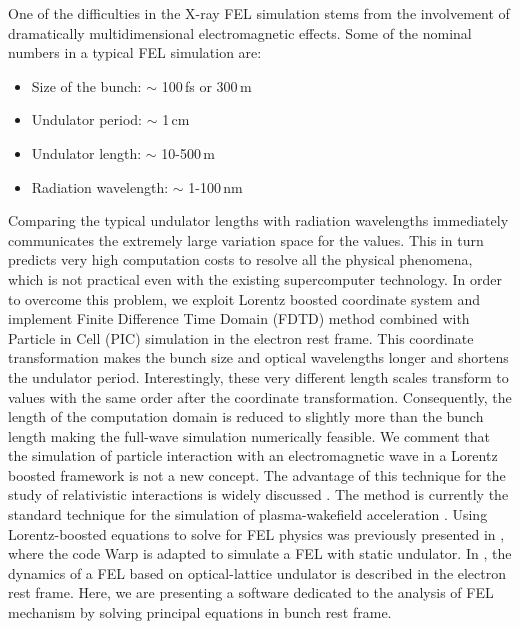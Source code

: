One of the difficulties in the X-ray FEL simulation stems from the involvement of dramatically multidimensional electromagnetic effects.
%
Some of the nominal numbers in a typical FEL simulation are:
%
\begin{itemize}
  \item Size of the bunch: $\sim$ 100\,fs or 300\,{\textmu}m
	\item Undulator period: $\sim$ 1\,cm
	\item Undulator length: $\sim$ 10-500\,m
	\item Radiation wavelength: $\sim$ 1-100\,nm
\end{itemize}
%
Comparing the typical undulator lengths with radiation wavelengths immediately communicates the extremely large variation space for the values.
%
This in turn predicts very high computation costs to resolve all the physical phenomena, which is not practical even with the existing supercomputer technology.
%
In order to overcome this problem, we exploit Lorentz boosted coordinate system and implement Finite Difference Time Domain (FDTD) \cite{taflove2000computational} method combined with Particle in Cell (PIC) simulation in the electron rest frame.
%
This coordinate transformation makes the bunch size and optical wavelengths longer and shortens the undulator period.
%
Interestingly, these very different length scales transform to values with the same order after the coordinate transformation.
%
Consequently, the length of the computation domain is reduced to slightly more than the bunch length making the full-wave simulation numerically feasible.
%
We comment that the simulation of particle interaction with an electromagnetic wave in a Lorentz boosted framework is not a new concept.
%
The advantage of this technique for the study of relativistic interactions is widely discussed \cite{vay2007,sprangle1979stimulated}.
%
The method is currently the standard technique for the simulation of plasma-wakefield acceleration \cite{yu2014modeling,vay2013domain,vay2012novel}.
%
Using Lorentz-boosted equations to solve for FEL physics was previously presented in \cite{fawley2009use}, where the code Warp is adapted to simulate a FEL with static undulator.
%
In \cite{andriyash2012}, the dynamics of a FEL based on optical-lattice undulator is described in the electron rest frame.
%
Here, we are presenting a software dedicated to the analysis of FEL mechanism by solving principal equations in bunch rest frame.

